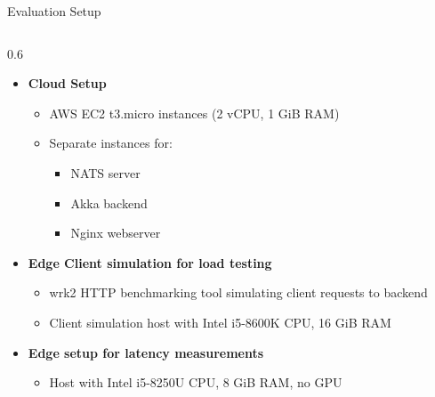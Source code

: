 \documentclass[aspectratio=169]{beamer}
\newcommand{\kw}[1]{\textbf{\textcolor{Accent}{#1}}}
\begin{document}


\begin{frame}{Evaluation Setup}
\begin{columns}[T,totalwidth=\textwidth]

\begin{column}{0.6\textwidth}
\vspace{0.5em}

\begin{itemize}
  \item<+-> \kw{Cloud Setup}
      \begin{itemize}
          \item AWS EC2 t3.micro instances (2 vCPU, 1 GiB RAM)
          \item Separate instances for:
            \begin{itemize}
              \item NATS server
              \item Akka backend
              \item Nginx webserver
            \end{itemize}
      \end{itemize}

  \item<+-> \kw{Edge Client simulation for load testing}
      \begin{itemize}
        \item wrk2 HTTP benchmarking tool simulating client requests to backend
        \item Client simulation host with Intel i5-8600K CPU, 16 GiB RAM   
      \end{itemize}

  \item<+-> \kw{Edge setup for latency measurements}
      \begin{itemize}
        \item Host with Intel i5-8250U CPU, 8 GiB RAM, no GPU   
      \end{itemize}
\end{itemize}
\end{column}



\end{columns}
\end{frame}

\end{document}
